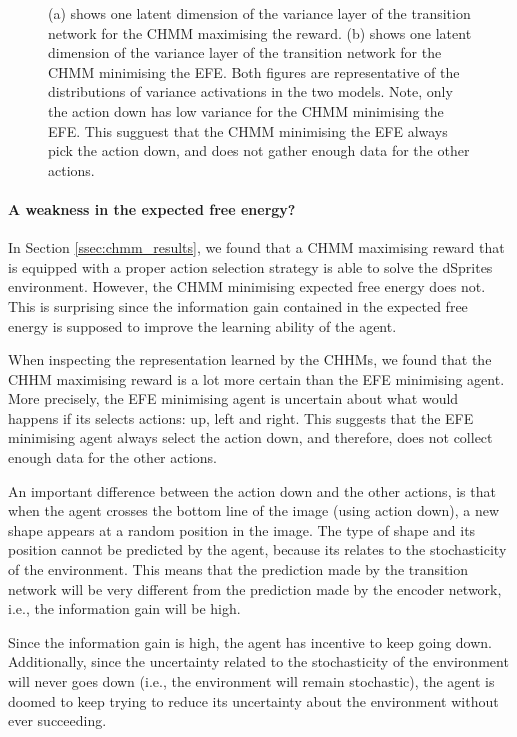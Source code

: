 \documentclass[twoside,11pt]{article}
\begin{document}
\begin{figure}[ht!]
    \caption{(a) shows one latent dimension of the variance layer of the transition network for the CHMM maximising the reward.
             (b) shows one latent dimension of the variance layer of the transition network for the CHMM minimising the EFE.
             Both figures are representative of the distributions of variance activations in the two models.
             Note, only the action down has low variance for the CHMM minimising the EFE.
             This sugguest that the CHMM minimising the EFE always pick the action down, and does not gather enough data for the other actions.
    }
    \label{fig:cka-chmm-trans-sa}
\end{figure}

\paragraph{A weakness in the expected free energy?}

In Section \ref{ssec:chmm_results}, we found that a CHMM maximising reward that is equipped with a proper action selection strategy is able to solve the dSprites environment. However, the CHMM minimising expected free energy does not. This is surprising since the information gain contained in the expected free energy is supposed to improve the learning ability of the agent.

When inspecting the representation learned by the CHHMs, we found that the CHHM maximising reward is a lot more certain than the EFE minimising agent. More precisely, the EFE minimising agent is uncertain about what would happens if its selects actions: up, left and right. This suggests that the EFE minimising agent always select the action down, and therefore, does not collect enough data for the other actions.

An important difference between the action down and the other actions, is that when the agent crosses the bottom line of the image (using action down), a new shape appears at a random position in the image. The type of shape and its position cannot be predicted by the agent, because its relates to the stochasticity of the environment. This means that the prediction made by the transition network will be very different from the prediction made by the encoder network, i.e., the information gain will be high.

Since the information gain is high, the agent has incentive to keep going down. Additionally, since the uncertainty related to the stochasticity of the environment will never goes down (i.e., the environment will remain stochastic), the agent is doomed to keep trying to reduce its uncertainty about the environment without ever succeeding.
\end{document}

